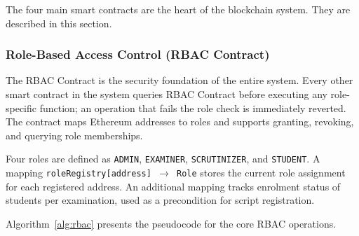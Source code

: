 \documentclass[conference]{IEEEtran}
\begin{document}
The four main smart contracts are the heart of the blockchain system. They are described in this section.
\subsubsection{Role-Based Access Control (RBAC Contract)}
\label{subsec:rbac}

The RBAC Contract is the security foundation of the entire system. Every
other smart contract in the system queries RBAC Contract before
executing any role-specific function; an operation that fails the role check
is immediately reverted. The contract maps Ethereum addresses to roles and
supports granting, revoking, and querying role memberships.

Four roles are defined as \texttt{ADMIN}, \texttt{EXAMINER}, \texttt{SCRUTINIZER}, and \texttt{STUDENT}.
A mapping \texttt{roleRegistry[address] $\rightarrow$ Role} stores the
current role assignment for each registered address. An additional mapping
tracks enrolment status of students per examination, used as a precondition
for script registration.

Algorithm~\ref{alg:rbac} presents the pseudocode for the core RBAC
operations.
\end{document}
